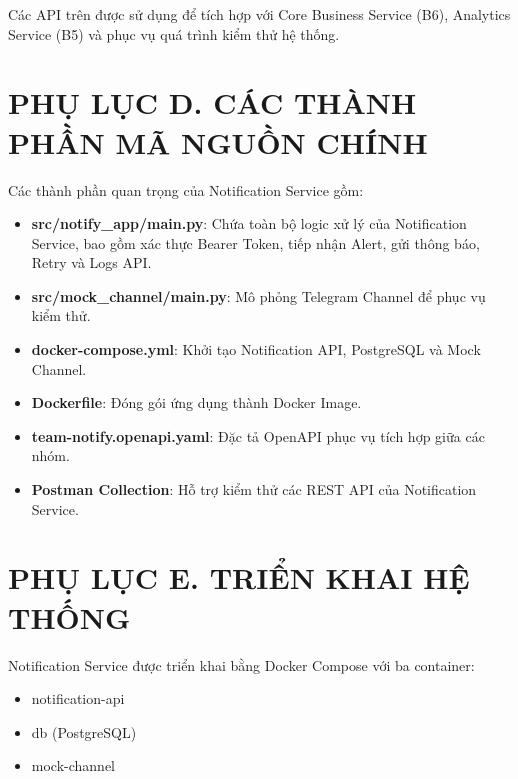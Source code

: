 Các API trên được sử dụng để tích hợp với Core Business Service (B6), Analytics Service (B5) và phục vụ quá trình kiểm thử hệ thống.

\section*{PHỤ LỤC D. CÁC THÀNH PHẦN MÃ NGUỒN CHÍNH}

Các thành phần quan trọng của Notification Service gồm:

\begin{itemize}

\item \textbf{src/notify\_app/main.py}: Chứa toàn bộ logic xử lý của Notification Service, bao gồm xác thực Bearer Token, tiếp nhận Alert, gửi thông báo, Retry và Logs API.

\item \textbf{src/mock\_channel/main.py}: Mô phỏng Telegram Channel để phục vụ kiểm thử.

\item \textbf{docker-compose.yml}: Khởi tạo Notification API, PostgreSQL và Mock Channel.

\item \textbf{Dockerfile}: Đóng gói ứng dụng thành Docker Image.

\item \textbf{team-notify.openapi.yaml}: Đặc tả OpenAPI phục vụ tích hợp giữa các nhóm.

\item \textbf{Postman Collection}: Hỗ trợ kiểm thử các REST API của Notification Service.

\end{itemize}

\section*{PHỤ LỤC E. TRIỂN KHAI HỆ THỐNG}

Notification Service được triển khai bằng Docker Compose với ba container:

\begin{itemize}

\item notification-api

\item db (PostgreSQL)

\item mock-channel

\end{itemize}

